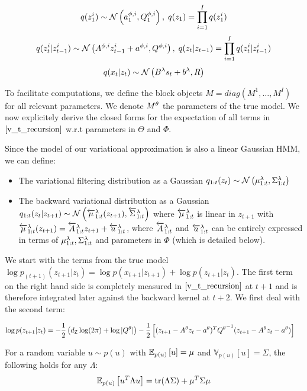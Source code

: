 \documentclass{article}
\begin{document}
$$q(z_1^i) \sim \mathcal{N}\left( a_1^{\phi,i}, Q_1^{\phi,i} \right), \; q(z_1) = \prod_{i=1}^I q(z_1^i)$$
$$q(z_t^i|z_{t-1}^i) \sim \mathcal{N}\left( A^{\phi,i} z_{t-1}^i + a^{\phi,i}, Q^{\phi,i} \right), \; q(z_t|z_{t-1}) = \prod_{i=1}^I q(z_t^i|z_{t-1}^i)$$
$$q(x_t|z_t) \sim \mathcal{N}\left( B^\lambda s_t + b^\lambda, R \right)$$

To facilitate computations, we define the block objects $M = diag(M^1, \ldots, M^I)$ for all relevant parameters. We denote $M^\theta$ the parameters of the true model. We now explicitely derive the closed forms for the expectation of all terms in $\ref{v_t_recursion}$ w.r.t parameters in $\Theta$ and $\Phi$. 

Since the model of our variational approximation is also a linear Gaussian HMM, we can define: 

\begin{itemize}
    \item The variational filtering distribution as a Gaussian $q_{1:t}(z_{t}) \sim \mathcal{N}\left( \mu_{1:t}^\lambda, \Sigma_{1:t}^\lambda \right)$
    \item The backward variational distribution as a Gaussian $q_{1:t}(z_{t}|z_{t + 1}) \sim \mathcal{N}\left( \overleftarrow{\mu}_{1:t}^\lambda(z_{t+1}), \overleftarrow{\Sigma}_{1:t}^\lambda \right)$ where $\overleftarrow{\mu}_{1:t}^\lambda$ is linear in $z_{t+1}$ with $\overleftarrow{\mu}_{1:t}^\lambda(z_{t+1}) = \overleftarrow{A}_{1:t}^\lambda z_{t+1} + \overleftarrow{a}_{1:t}^\lambda$, where $\overleftarrow{A}_{1:t}^\lambda$ and $\overleftarrow{a}_{1:t}^\lambda$ can be entirely expressed in terms of $\mu_{1:t}^\lambda, \Sigma_{1:t}^\lambda$ and parameters in $\Phi$ (which is detailed below).
\end{itemize} 

We start with the terms from the true model $\log p_{(t+1)}(z_{t+1}|z_t) = \log p(x_{t+1}|z_{t+1}) + \log p(z_{t+1}|z_t)$. The first term on the right hand side is completely measured in $\ref{v_t_recursion}$ at $t+1$ and is therefore integrated later against the backward kernel at $t+2$. We first deal with the second term:

\begin{align}
    \log p(z_{t+1}|z_t) &= -\frac{1}{2}\left(d_\mathsf{Z} \log(2\pi) + \log |Q^\theta|\right) - \frac{1}{2}\left[(z_{t+1} - A^\theta z_t - a^\theta)^T {Q^\theta}^{-1} (z_{t+1} - A^\theta z_t - a^\theta)\right]
\end{align}

For a random variable $u \sim p(u)$ with $\mathbb{E}_{p(u)}\left[u\right] = \mu$ and $\mathbb{V}_{p(u)}[u] = \Sigma$, the following holds for any $\Lambda$:
$$\mathbb{E}_{p(u)}\left[u^T \Lambda u\right] = \text{tr}(\Lambda \Sigma) + \mu^T \Sigma \mu$$
\end{document}
